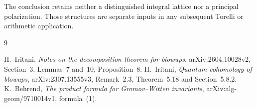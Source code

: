 \documentclass[11pt]{article}
\begin{document}
The conclusion retains neither a distinguished integral lattice nor a
principal polarization. Those structures are separate inputs in any
subsequent Torelli or arithmetic application.

\begin{thebibliography}{9}
\raggedright
{} H.~Iritani, \emph{Notes on the decomposition theorem for
blowups}, arXiv:2604.10028v2, Section~3, Lemmas~7 and~10, Proposition~8.
 H.~Iritani, \emph{Quantum cohomology of blowups},
arXiv:2307.13555v3, Remark~2.3, Theorem~5.18 and Section~5.8.2.
 K.~Behrend, \emph{The product formula for
Gromov--Witten invariants}, arXiv:alg-geom/9710014v1, formula~(1).
\end{thebibliography}
\end{document}
